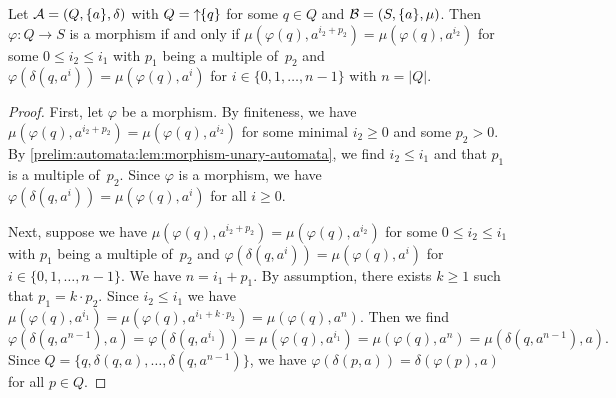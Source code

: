 \begin{proposition} \label{prelim:automata:prop:morphism-unary-automata}
	Let $\mathcal A = (Q, \{a\}, \delta)$
	with $Q = \mbox{\ensuremath{\displaystyle \uparrow \!\!\{q\}}}$ for some $q \in Q$
	and $\mathcal B = (S, \{a\}, \mu)$.
	Then $\varphi \colon Q \to S$ is a morphism if and only if $\mu(\varphi(q), a^{i_2 + p_2}) = \mu(\varphi(q), a^{i_2})$
	for some $0 \le i_2 \le i_1$ with $p_1$ being a multiple of~$p_2$
	and $\varphi(\delta(q, a^i)) = \mu(\varphi(q), a^i)$ for $i \in\{0,1,\ldots,n-1\}$
	with $n = |Q|$.
\end{proposition}
\begin{proof}
	First, let $\varphi$ be a morphism.
	By finiteness, we have  $\mu(\varphi(q), a^{i_2 + p_2}) = \mu(\varphi(q), a^{i_2})$
	for some minimal $i_2 \ge 0$ and some $p_2 > 0$.
	By \cref{prelim:automata:lem:morphism-unary-automata},
	we find $i_2 \le i_1$ and that $p_1$ is a multiple of~$p_2$.
	Since $\varphi$ is a morphism,
	we have $\varphi(\delta(q, a^i)) = \mu(\varphi(q), a^i)$ for all $i \ge 0$.
	
	Next, suppose we have $\mu(\varphi(q), a^{i_2 + p_2}) = \mu(\varphi(q), a^{i_2})$
	for some $0 \le i_2 \le i_1$ with $p_1$ being a multiple of~$p_2$
	and  $\varphi(\delta(q, a^i)) = \mu(\varphi(q), a^i)$ for $i \in\{0,1,\ldots,n-1\}$.
	We have $n = i_1 + p_1$.
	By assumption, there exists $k \ge 1$ such that $p_1 = k\cdot p_2$.
	Since $i_2 \le i_1$ 
	we have $\mu(\varphi(q), a^{i_1}) = \mu(\varphi(q), a^{i_1 + k\cdot p_2}) = \mu(\varphi(q), a^n)$.
	Then we find	
	\[
	\varphi(\delta(q, a^{n - 1}), a) = \varphi(\delta(q, a^{i_1}))
	= \mu(\varphi(q), a^{i_1})
	= \mu(\varphi(q), a^n)
	= \mu(\delta(q, a^{n - 1}), a).
	\]
	Since $Q = \{q, \delta(q, a), \ldots, \delta(q, a^{n-1})\}$, 
	we have $\varphi(\delta(p, a)) = \delta(\varphi(p), a)$
	for all $p \in Q$.
\end{proof}

